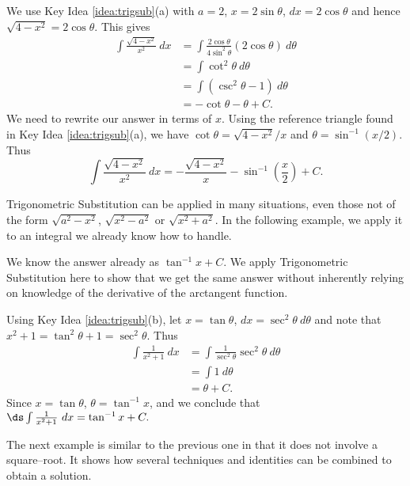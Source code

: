 {We use Key Idea \ref{idea:trigsub}(a) with $a=2$, $x=2\sin \theta$, $dx = 2\cos \theta$ and hence $\sqrt{4-x^2} = 2\cos\theta$. This gives
\begin{align*}
\int \frac{\sqrt{4-x^2}}{x^2}\ dx &= \int \frac{2\cos\theta}{4\sin^2\theta}(2\cos\theta)\ d\theta\\
		&= \int \cot^2\theta\ d\theta\\
		&=	\int (\csc^2\theta -1)\ d\theta\\
		&= -\cot\theta -\theta + C.
\end{align*}
We need to rewrite our answer in terms of $x$. Using the reference triangle found in Key Idea \ref{idea:trigsub}(a), we have $\cot\theta = \sqrt{4-x^2}/x$ and $\theta = \sin^{-1}(x/2)$. Thus
$$\int \frac{\sqrt{4-x^2}}{x^2}\ dx = -\frac{\sqrt{4-x^2}}x-\sin^{-1}\left(\frac x2\right) + C.$$}

Trigonometric Substitution can be applied in many situations, even those not of the form $\sqrt{a^2-x^2}$, $\sqrt{x^2-a^2}$ or $\sqrt{x^2+a^2}$. In the following example, we apply it to an integral we already know how to handle.

{We know the answer already as $\tan^{-1}x+C$. We apply Trigonometric Substitution here to show that we get the same answer without inherently relying on knowledge of the derivative of the arctangent function.

Using Key Idea \ref{idea:trigsub}(b), let $x=\tan\theta$, $dx=\sec^2\theta\ d\theta$ and note that $x^2+1 = \tan^2\theta+1 = \sec^2\theta$. Thus
\begin{align*}
\int \frac1{x^2+1}\ dx &= \int \frac{1}{\sec^2\theta}\sec^2\theta\ d\theta \\
			&= \int 1\ d\theta\\
			&= \theta + C.
\end{align*}
Since $x=\tan \theta$, $\theta = \tan^{-1}x$, and we conclude that $\ds \int\frac1{x^2+1}\ dx = \tan^{-1}x+C.$}

The next example is similar to the previous one in that it does not involve a square--root. It shows how several techniques and identities can be combined to obtain a solution.

